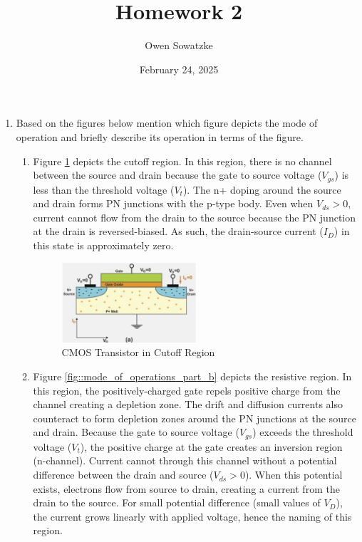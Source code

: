 \documentclass[fleqn]{article}
\title{Homework 2}
\author{Owen Sowatzke}
\date{February 24, 2025}
\newcommand{\zerodisplayskip}{
	\setlength{\abovedisplayskip}{0pt}%
	\setlength{\belowdisplayskip}{0pt}%
	\setlength{\abovedisplayshortskip}{0pt}%
	\setlength{\belowdisplayshortskip}{0pt}%
	\setlength{\mathindent}{0pt}}
\begin{document}
	\offinterlineskip
	\setlength{\lineskip}{12pt}
	\zerodisplayskip
	\maketitle
	
	\begin{enumerate}
		\item Based on the figures below mention which figure depicts the mode of operation and briefly describe its operation in terms of the figure.
		
		\begin{enumerate}
		
			\item Figure \ref{fig::mode_of_operations_part_a} depicts the cutoff region. In this region, there is no channel between the source and drain because the gate to source voltage ($V_{gs}$) is less than the threshold voltage ($V_t$). The n+ doping around the source and drain forms PN junctions with the p-type body. Even when $V_{ds} > 0$, current cannot flow from the drain to the source because the PN junction at the drain is reversed-biased. As such, the drain-source current ($I_{D}$) in this state is approximately zero.
			
			\begin{figure}[H]				
				\centerline{\includegraphics[width=0.5\textwidth]{mode_of_operations_part_a.png}}
				\caption{CMOS Transistor in Cutoff Region}
				\label{fig::mode_of_operations_part_a}
			\end{figure}
		
			\item Figure \ref{fig::mode_of_operations_part_b} depicts the resistive region. In this region, the positively-charged gate repels positive charge from the channel creating a depletion zone. The drift and diffusion currents also counteract to form depletion zones around the PN junctions at the source and drain. Because the gate to source voltage ($V_{gs}$) exceeds the threshold voltage ($V_t$), the positive charge at the gate creates an inversion region (n-channel). Current cannot through this channel without a potential difference between the drain and source ($V_{ds} > 0$). When this potential exists, electrons flow from source to drain, creating a current from the drain to the source. For small potential difference (small values of $V_D$), the current grows linearly with applied voltage, hence the naming of this region.
			

\end{enumerate}
\end{enumerate}
\end{document}
